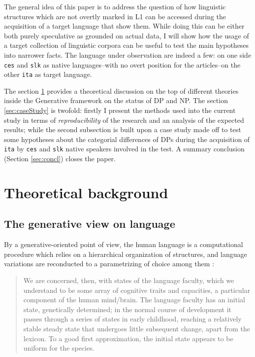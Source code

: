 \documentclass[a4paper,twoside,12pt,chapterprefix=false,listof=flat]{scrartcl}
\theoremstyle{plain} %
\theoremstyle{definition}
\theoremstyle{remark}
\begin{document}
The general idea of this paper is to address the question of how
linguistic structures which are not overtly marked in L1 can be accessed
during the acquisition of a target language that show them. While doing
this can be either both purely speculative as grounded on actual data, I
will show how the usage of a target collection of linguistic corpora can
be useful to test the main hypotheses into narrower facts. The language
under observation are indeed a few: on one side \texttt{ces} and
\texttt{slk} as native languages--with no overt position for the
articles--on the other \texttt{ita} as target language.

The section \ref{sec:theoryBg} provides a theoretical discussion on the
top of different theories inside the Generative framework
\citep{chomsky1995} on the status of DP and NP. The section
\ref{sec:caseStudy} is twofold: firstly I present the methods used into
the current study in terms of \emph{reproducibility} of the research and
an analysis of the expected results; while the second subsection is
built upon a case study made off to test some hypotheses about the
categorial differences of DPs during the acquisition of \texttt{ita} by
\texttt{ces} and \texttt{slk} native speakers involved in the test. A
summary conclusion (Section \ref{sec:concl}) closes the paper.

\hypertarget{sec:theoryBg}{%
\section{Theoretical background}\label{sec:theoryBg}}

\hypertarget{the-generative-view-on-language}{%
\subsection{The generative view on
language}\label{the-generative-view-on-language}}

By a generative-oriented point of view, the human language is a
computational procedure which relies on a hierarchical organization of
structures, and language variations are reconducted to a parametrizing
of choice among them
\citep{adger2013, chomsky1995, chomsky1998, chomsky2013, chomsky2015, rizzi2013}:

\begin{quote}
We are concerned, then, with states of the language faculty, which we
understand to be some array of cognitive traits and capacities, a
particular component of the human mind/brain. The language faculty has
an initial state, genetically determined; in the normal course of
development it passes through a series of states in early childhood,
reaching a relatively stable steady state that undergoes little
subsequent change, apart from the lexicon. To a good first
approximation, the initial state appears to be uniform for the species.
\citep{chomsky1995}
\end{quote}
\end{document}
